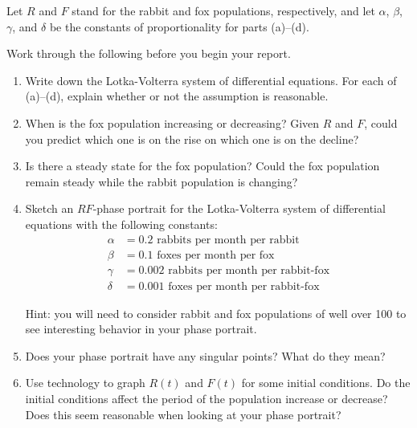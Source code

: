 \documentclass[letter]{article}
\begin{document}
	Let $R$ and $F$ stand for the rabbit and fox populations, respectively, and
	let $\alpha$, $\beta$, $\gamma$, and $\delta$ be the constants of proportionality for
	parts (a)--(d).

	Work through the following before you begin your report.

	\begin{enumerate}
		\item Write down the Lotka-Volterra system of differential equations.  For
			each of (a)--(d), explain whether or not the assumption is reasonable.
		\item When is the fox population increasing or decreasing?  Given $R$ and $F$,
			could you predict which one is on the rise on which one is on the decline?
		\item Is there a steady state for the fox population?  Could the fox population
			remain steady while the rabbit population is changing?
		\item \label{params}
			Sketch an $RF$-phase portrait for the Lotka-Volterra system of differential
			equations with the following constants:
			\begin{align*}
				\alpha &= 0.2\text{ rabbits per month per rabbit}\\
				\beta &= 0.1\text{ foxes per month per fox}\\
				\gamma &= 0.002\text{ rabbits per month per rabbit-fox}\\
				\delta &= 0.001\text{ foxes per month per rabbit-fox}
			\end{align*}

			Hint: you will need to consider rabbit and fox populations of well over
			100 to see interesting behavior in your phase portrait.
		\item Does your phase portrait have any singular points?  What do they mean?
		\item Use technology to graph $R(t)$ and $F(t)$ for some initial conditions.  
			Do the initial conditions affect the period of the population increase
			or decrease?  Does this seem reasonable when looking at your phase portrait?
	\end{enumerate}
\end{document}

